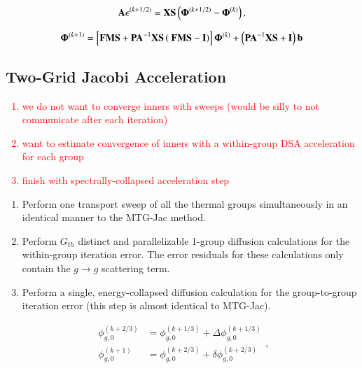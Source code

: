 \documentclass[preprint,10pt]{elsarticle}
\newcommand{\tcr}[1]{\textcolor{red}{#1}}
\begin{document}
\begin{equation}
\label{eq::DSA_MTG_1G_err_eq_op}
{\bf A} \epsilon^{(k+1/2)}  =  {\bf X} {\bf S} \left(  {\bf \Phi}^{(k+1/2)} - {\bf \Phi}^{(k)}  \right),
\end{equation}

\begin{equation}
\label{eq::DSA_MTG_Jac_op_update_simple}
 {\bf \Phi}^{(k+1)}= \left[ {\bf F}  {\bf M} {\bf S} +  {\bf P} {\bf A}^{-1}  {\bf X} {\bf S} \left(  \ {\bf F}  {\bf M} {\bf S}  -  {\bf I} \right) \right] {\bf \Phi}^{(k)} + \left(  {\bf P} {\bf A}^{-1}  {\bf X} {\bf S}  + {\bf I} \right) {\bf b}
\end{equation}

\subsection{Two-Grid Jacobi Acceleration}
\tcr
{
\begin{enumerate}
\item we do not want to converge inners with sweeps (would be silly to not communicate after each iteration)
\item want to estimate convergence of inners with a within-group DSA acceleration for each group
\item finish with spectrally-collapsed acceleration step
\end{enumerate}
}



\begin{enumerate}
\item Perform one transport sweep of all the thermal groups simultaneously in an identical manner to the MTG-Jac method.
\item Perform $G_{th}$ distinct and parallelizable 1-group diffusion calculations for the within-group iteration error. The error residuals for these calculations only contain the $g\rightarrow g$ scattering term.
\item Perform a single, energy-collapsed diffusion calculation for the group-to-group iteration error (this step is almost identical to MTG-Jac).
\end{enumerate}

\begin{equation}
\label{eq::DSA_MJIA_update}
\begin{aligned}
\phi_{g,0}^{(k+2/3)} &=  \phi_{g,0}^{(k+1/3)}  + \Delta \phi_{g,0}^{(k+1/3)} \\
\phi_{g,0}^{(k+1)} &=  \phi_{g,0}^{(k+2/3)}  + \delta \phi_{g,0}^{(k+2/3)}
\end{aligned} ,
\end{equation}
\end{document}
